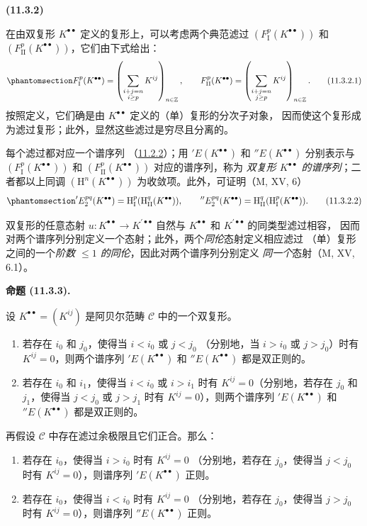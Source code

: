 \documentclass[UTF8,fontset=none,11pt,oneside,openany]{ctexbook}
\newenvironment{env}[1][]{%
  \par\medskip\noindent\textbf{(#1)}\ %
}{\par}
\newenvironment{proposition}[1][]{%
  \par\medskip\noindent\textbf{命题 (#1).}\ %
}{\par}
\newcommand{\oldpage}[2][]{%
  \hypertarget{ega-source-page-#1-#2}{}%
  \marginnote{\scriptsize\textbf{#1}~|~#2}\ignorespaces}
\let\EGAOriginalLabel\label
\renewcommand{\label}[1]{\phantomsection\EGAOriginalLabel{#1}}
\begin{document}
\begin{env}[11.3.2]
\label{0.11.3.2-fr}
在由双复形 $K^{\bullet\bullet}$ 定义的复形上，可以考虑两个典范滤过
$(F_{\mathrm I}^p(K^{\bullet\bullet}))$ 和
$(F_{\mathrm{II}}^p(K^{\bullet\bullet}))$，它们由下式给出：
\[
\label{0.11.3.2.1-fr}
  F_{\mathrm I}^p(K^{\bullet\bullet})
  =\left(\sum_{\substack{i+j=n\\i\geq p}}K^{ij}\right)_{n\in\mathbb Z},
  \qquad
  F_{\mathrm{II}}^p(K^{\bullet\bullet})
  =\left(\sum_{\substack{i+j=n\\j\geq p}}K^{ij}\right)_{n\in\mathbb Z}.
  \tag{11.3.2.1}
\]
\oldpage[0\textsubscript{III}]{30}
按照定义，它们确是由 $K^{\bullet\bullet}$ 定义的（单）复形的分次子对象，
因而使这个复形成为滤过复形；此外，显然这些滤过是穷尽且分离的。

每个滤过都对应一个谱序列
（\hyperref[0.11.2.2-fr]{11.2.2}）；用
$'E(K^{\bullet\bullet})$ 和 $''E(K^{\bullet\bullet})$ 分别表示与
$(F_{\mathrm I}^p(K^{\bullet\bullet}))$ 和
$(F_{\mathrm{II}}^p(K^{\bullet\bullet}))$ 对应的谱序列，称为
\emph{双复形 $K^{\bullet\bullet}$ 的谱序列}；二者都以上同调
$(\mathrm H^n(K^{\bullet\bullet}))$ 为收敛项。此外，可证明（M, XV, 6）
\[
\label{0.11.3.2.2-fr}
  'E_2^{pq}(K^{\bullet\bullet})
  =\mathrm H_{\mathrm I}^p(\mathrm H_{\mathrm{II}}^q(K^{\bullet\bullet})),
  \qquad
  ''E_2^{pq}(K^{\bullet\bullet})
  =\mathrm H_{\mathrm{II}}^q(\mathrm H_{\mathrm I}^p(K^{\bullet\bullet})).
  \tag{11.3.2.2}
\]

双复形的任意态射 $u:K^{\bullet\bullet}\to K^{\prime\bullet\bullet}$
自然与 $K^{\bullet\bullet}$ 和 $K^{\prime\bullet\bullet}$ 的同类型滤过相容，
因而对两个谱序列分别定义一个态射；此外，两个\emph{同伦}态射定义相应滤过
（单）复形之间的一个\emph{阶数 $\leq1$ 的同伦}，因此对两个谱序列分别定义
\emph{同一个}态射（M, XV, 6.1）。
\end{env}

\begin{proposition}[11.3.3]
\label{0.11.3.3-fr}
设 $K^{\bullet\bullet}=(K^{ij})$ 是阿贝尔范畴 $\mathcal C$ 中的一个双复形。
\begin{enumerate}
  \item[(i)] 若存在 $i_0$ 和 $j_0$，使得当 $i<i_0$ 或 $j<j_0$
    （分别地，当 $i>i_0$ 或 $j>j_0$）时有 $K^{ij}=0$，则两个谱序列
    $'E(K^{\bullet\bullet})$ 和 $''E(K^{\bullet\bullet})$ 都是双正则的。
  \item[(ii)] 若存在 $i_0$ 和 $i_1$，使得当 $i<i_0$ 或 $i>i_1$ 时有
    $K^{ij}=0$（分别地，若存在 $j_0$ 和 $j_1$，使得当 $j<j_0$ 或
    $j>j_1$ 时有 $K^{ij}=0$），则两个谱序列
    $'E(K^{\bullet\bullet})$ 和 $''E(K^{\bullet\bullet})$ 都是双正则的。
\end{enumerate}
再假设 $\mathcal C$ 中存在滤过余极限且它们正合。那么：
\begin{enumerate}
  \item[(iii)] 若存在 $i_0$，使得当 $i>i_0$ 时有 $K^{ij}=0$
    （分别地，若存在 $j_0$，使得当 $j<j_0$ 时有 $K^{ij}=0$），则谱序列
    $'E(K^{\bullet\bullet})$ 正则。
  \item[(iv)] 若存在 $i_0$，使得当 $i<i_0$ 时有 $K^{ij}=0$
    （分别地，若存在 $j_0$，使得当 $j>j_0$ 时有 $K^{ij}=0$），则谱序列
    $''E(K^{\bullet\bullet})$ 正则。
\end{enumerate}
\end{proposition}
\end{document}
